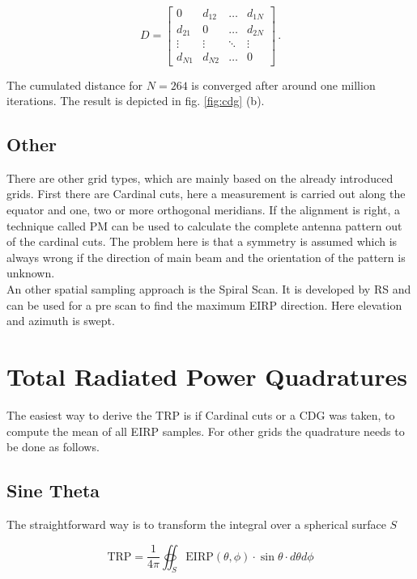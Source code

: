 \begin{equation}
D = \begin{bmatrix}
 0 & d_{12} & \dots & d_{1N}\\
 d_{21} & 0 & \dots & d_{2N}\\
 \vdots & \vdots & \ddots & \vdots\\
 d_{N1} & d_{N2} & \dots & 0
\end{bmatrix}\,.
\end{equation}

The cumulated distance for $N = 264$ is converged after around one million iterations. The result is depicted in fig. \ref{fig:cdg} (b).

\subsection{Other}

There are other grid types, which are mainly based on the already introduced grids. First there are Cardinal cuts, here a measurement is carried out along the equator and one, two or more orthogonal meridians. If the alignment is right, a technique called \acf{PM} can be used to calculate the complete antenna pattern out of the cardinal cuts. The problem here is that a symmetry is assumed which is always wrong if the direction of main beam and the orientation of the pattern is unknown. \cite{2018arXiv180310993F}\\
An other spatial sampling approach is the Spiral Scan. It is developed by \ac{RS} and can be used for a pre scan to find the maximum \ac{EIRP} direction. Here elevation and azimuth is swept. \cite{ctiaat}

\section{Total Radiated Power Quadratures}
\label{sec:quadrature}

The easiest way to derive the \ac{TRP} is if Cardinal cuts or a \ac{CDG} was taken, to compute the mean of all \ac{EIRP} samples. For other grids the quadrature needs to be done as follows. \cite{trp}

\subsection{Sine Theta}

The straightforward way is to transform the integral over a spherical surface $S$

\begin{equation}
\text{TRP} = \frac{1}{4\pi}  \oiint_S \text{EIRP}\left(\theta,\phi\right)\cdot\sin\theta\cdot d\theta d\phi
\label{eq:trpint}
\end{equation}

